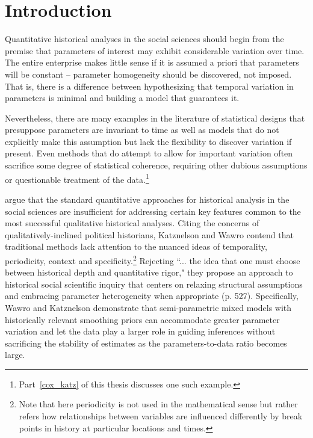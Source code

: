 \chapter{Introduction}
\label{introduction}


Quantitative historical analyses in the social sciences should begin from the premise that 
parameters of interest may exhibit considerable variation over time. The entire enterprise 
makes little sense if it is assumed a priori that parameters will be constant -- parameter 
homogeneity should be discovered, not imposed. That is, there is a difference between 
hypothesizing that temporal variation in parameters is minimal and building a model that 
guarantees it. 

Nevertheless, there are many examples in the literature of statistical designs 
that presuppose parameters are invariant to time as well as models that do not explicitly 
make this assumption but lack the flexibility to discover variation if present.  Even methods that 
do attempt to allow for important variation often sacrifice some degree of statistical 
coherence, requiring other dubious assumptions or questionable treatment of the data.\footnote{
Part~\ref{cox_katz} of this thesis discusses one such example.}

 argue that the standard quantitative approaches for historical 
analysis in the social sciences are insufficient for addressing certain key features common to 
the most successful qualitative historical analyses. Citing the concerns of qualitatively-inclined 
political historians, Katznelson and Wawro contend that traditional methods lack attention to 
the nuanced ideas of temporality, periodicity, context and specificity.\footnote{Note that here 
periodicity is not used in the mathematical sense but rather refers how relationships between 
variables are influenced differently by break points in history at particular locations and times.}  
Rejecting ``... the idea that one must choose between historical depth and quantitative rigor," 
they propose an approach to historical social scientific inquiry that centers on relaxing structural 
assumptions and embracing parameter heterogeneity when appropriate (p. 527). Specifically, 
Wawro and Katznelson demonstrate that semi-parametric mixed models with historically relevant 
smoothing priors can accommodate greater parameter variation and let the data play a larger role 
in guiding inferences without sacrificing the stability of estimates as the parameters-to-data ratio 
becomes large.  

